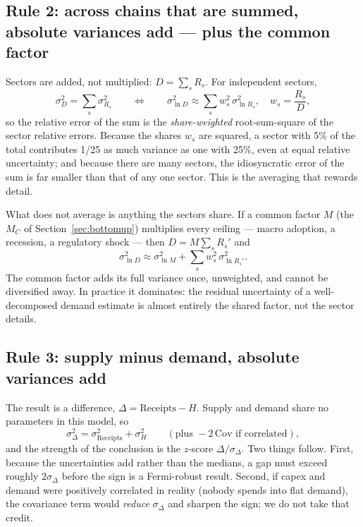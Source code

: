 \documentclass[11pt,letterpaper]{article}
\begin{document}
\subsection{Rule 2: across chains that are summed, absolute variances add --- plus the common factor}
Sectors are added, not multiplied: $D=\sum_s R_s$. For independent sectors,
\begin{equation}
\sigma^{2}_{D}=\sum_s\sigma^{2}_{R_s}
\qquad\Longleftrightarrow\qquad
\sigma^{2}_{\ln D}\approx\sum_s w_s^{2}\,\sigma^{2}_{\ln R_s},\quad w_s=\frac{R_s}{D},
\label{eq:sumrule}
\end{equation}
so the relative error of the sum is the \emph{share-weighted} root-sum-square of the sector relative errors. Because the shares $w_s$ are squared, a sector with 5\% of the total contributes 1/25 as much variance as one with 25\%, even at equal relative uncertainty; and because there are many sectors, the idiosyncratic error of the sum is far smaller than that of any one sector. This is the averaging that rewards detail.

What does not average is anything the sectors share. If a common factor $M$ (the $M_C$ of Section~\ref{sec:bottomup}) multiplies every ceiling --- macro adoption, a recession, a regulatory shock --- then $D=M\sum_s R_s'$ and
\begin{equation}
\sigma^{2}_{\ln D}\approx\sigma^{2}_{\ln M}+\sum_s w_s^{2}\,\sigma^{2}_{\ln R_s'}.
\label{eq:common}
\end{equation}
The common factor adds its full variance once, unweighted, and cannot be diversified away. In practice it dominates: the residual uncertainty of a well-decomposed demand estimate is almost entirely the shared factor, not the sector details.

\subsection{Rule 3: supply minus demand, absolute variances add}
The result is a difference, $\Delta=\text{Receipts}-H$. Supply and demand share no parameters in this model, so
\begin{equation}
\sigma^{2}_{\Delta}=\sigma^{2}_{\text{Receipts}}+\sigma^{2}_{H}\qquad(\text{plus }-2\,\text{Cov if correlated}),
\end{equation}
and the strength of the conclusion is the $z$-score $\Delta/\sigma_{\Delta}$. Two things follow. First, because the uncertainties add rather than the medians, a gap must exceed roughly $2\sigma_{\Delta}$ before the sign is a Fermi-robust result. Second, if capex and demand were positively correlated in reality (nobody spends into flat demand), the covariance term would \emph{reduce} $\sigma_{\Delta}$ and sharpen the sign; we do not take that credit.
\end{document}
